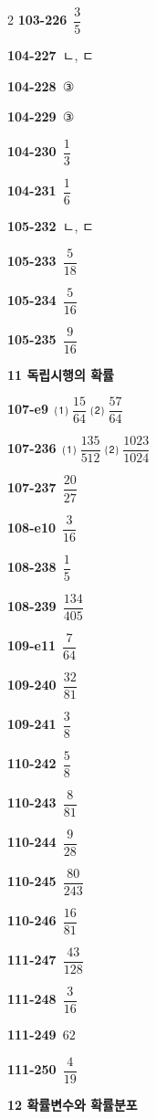 \documentclass[10pt,a4paper]{article}
\begin{document}
\begin{multicols}{2}
\noindent\textbf{103-226}\ $\dfrac{3}{5}$\par
\noindent\textbf{104-227}\ ㄴ, ㄷ\par
\noindent\textbf{104-228}\ ③\par
\noindent\textbf{104-229}\ ③\par
\noindent\textbf{104-230}\ $\dfrac{1}{3}$\par
\noindent\textbf{104-231}\ $\dfrac{1}{6}$\par
\noindent\textbf{105-232}\ ㄴ, ㄷ\par
\noindent\textbf{105-233}\ $\dfrac{5}{18}$\par
\noindent\textbf{105-234}\ $\dfrac{5}{16}$\par
\noindent\textbf{105-235}\ $\dfrac{9}{16}$\par
\noindent\textbf{11 독립시행의 확률}\par\smallskip
\noindent\textbf{107-e9}\ ⑴ $\dfrac{15}{64}$ ⑵ $\dfrac{57}{64}$\par
\noindent\textbf{107-236}\ ⑴ $\dfrac{135}{512}$ ⑵ $\dfrac{1023}{1024}$\par
\noindent\textbf{107-237}\ $\dfrac{20}{27}$\par
\noindent\textbf{108-e10}\ $\dfrac{3}{16}$\par
\noindent\textbf{108-238}\ $\dfrac{1}{5}$\par
\noindent\textbf{108-239}\ $\dfrac{134}{405}$\par
\noindent\textbf{109-e11}\ $\dfrac{7}{64}$\par
\noindent\textbf{109-240}\ $\dfrac{32}{81}$\par
\noindent\textbf{109-241}\ $\dfrac{3}{8}$\par
\noindent\textbf{110-242}\ $\dfrac{5}{8}$\par
\noindent\textbf{110-243}\ $\dfrac{8}{81}$\par
\noindent\textbf{110-244}\ $\dfrac{9}{28}$\par
\noindent\textbf{110-245}\ $\dfrac{80}{243}$\par
\noindent\textbf{110-246}\ $\dfrac{16}{81}$\par
\noindent\textbf{111-247}\ $\dfrac{43}{128}$\par
\noindent\textbf{111-248}\ $\dfrac{3}{16}$\par
\noindent\textbf{111-249}\ $62$\par
\noindent\textbf{111-250}\ $\dfrac{4}{19}$\par
\noindent\textbf{12 확률변수와 확률분포}\par\smallskip

\end{multicols}
\end{document}
